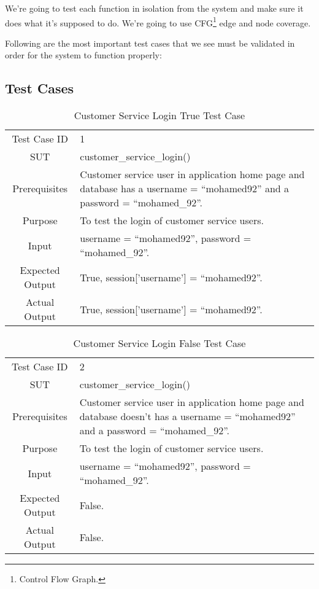 We're going to test each function in isolation from the system and make sure it does what it's supposed to do. We're going to use CFG\footnote{Control Flow Graph.} edge and node coverage.

Following are the most important test cases that we see must be validated in order for the system to function properly:

\subsection{Test Cases}
	\begin{table}[H]
		\centering
		\renewcommand{\arraystretch}{1.5}
		\begin{tabular}[t]{ c  m{10cm} }
			Test Case ID & 1  \\
			SUT &  customer\_service\_login()\\
			Prerequisites &  Customer service user in application home page and database has a username = ``mohamed92'' and a password = ``mohamed\_92''. \\
			Purpose & To test the login of customer service users.  \\
			Input &  username = ``mohamed92'', password = ``mohamed\_92''. \\
			Expected Output &  True, session['username'] = ``mohamed92''.\\
			Actual Output & True, session['username'] = ``mohamed92''.\\
		\end{tabular}
		\caption{Customer Service Login True Test Case}
		\renewcommand{\arraystretch}{1.0}
	\end{table}
	
	\begin{table}[H]
		\centering
		\renewcommand{\arraystretch}{1.5}
		\begin{tabular}[t]{ c  m{10cm} }
			Test Case ID & 2  \\
			SUT &  customer\_service\_login()\\
			Prerequisites &  Customer service user in application home page and database doesn't has a username = ``mohamed92'' and a password = ``mohamed\_92''.\\
			Purpose &  To test the login of customer service users.\\
			Input &  username = ``mohamed92'', password = ``mohamed\_92''.\\
			Expected Output & False. \\
			Actual Output & False. \\
		\end{tabular}
		\caption{Customer Service Login False Test Case}
		\renewcommand{\arraystretch}{1.0}
	\end{table}
	
